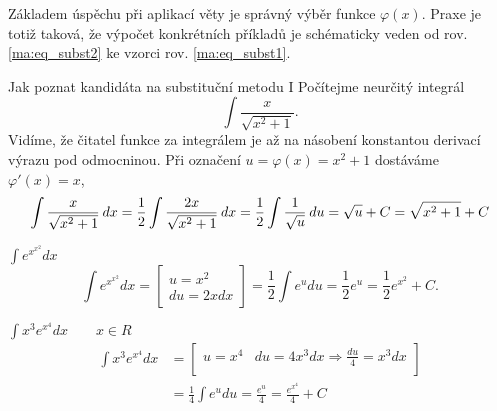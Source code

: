      Základem úspěchu při aplikací věty je správný výběr funkce $\varphi(x)$. Praxe je totiž
      taková, že výpočet konkrétních příkladů je schématicky veden od rov. \ref{ma:eq_subst2} ke
      vzorci rov. \ref{ma:eq_subst1}.
      
      \begin{example} Jak poznat kandidáta na substituční metodu I
        Počítejme neurčitý integrál \[\int \frac{x}{\sqrt{x^2+1}}.\]
        Vidíme, že čitatel funkce za integrálem je až na násobení konstantou derivací výrazu pod odmocninou. 
        Při označení \(u=\varphi(x) = x^2 + 1\) dostáváme \(\varphi'(x) = x\), 
        \begin{equation*}
          \int\frac{x}{\sqrt{x^2+1}}\hspace{2pt}dx = \frac{1}{2}\int\frac{2x}{\sqrt{x^2+1}}\hspace{2pt}dx
                                        = \frac{1}{2}\int\frac{1}{\sqrt{u}}\hspace{2pt}du = \sqrt{u} + C 
                                        = \sqrt{x^2 + 1} + C  
        \end{equation*}
      \end{example}
      
      \begin{example}\label{ma:ex_sub_metoda}$\displaystyle\int{e^{x^{x^2}}dx}$
        \begin{equation*}
            \int{e^{x^{x^2}}dx}=
               \left[
                 \begin{array}{c}u=x^2 \\ du=2xdx\end{array}
               \right]=
               \frac{1}{2}\int{e^udu}=\frac{1}{2}e^u=\frac{1}{2}e^{x^2}+C.
        \end{equation*}
      \end{example}
      \begin{example}$\displaystyle\int{x^3e^{x^4}}dx \qquad x\in R$
        \begin{align*}
          \displaystyle\int{x^3e^{x^4}}dx
             &= 
             \left[
               \begin{array}{cc}
                  u=x^4   & du=4x^3dx \Rightarrow \displaystyle\frac{du}{4} = x^3dx  \\
               \end{array}
             \right]                                                                           \\
             &= \frac{1}{4}\int{e^u}du = \frac{e^u}{4} = \frac{e^{x^4}}{4} + C 
        \end{align*}
      \end{example}

